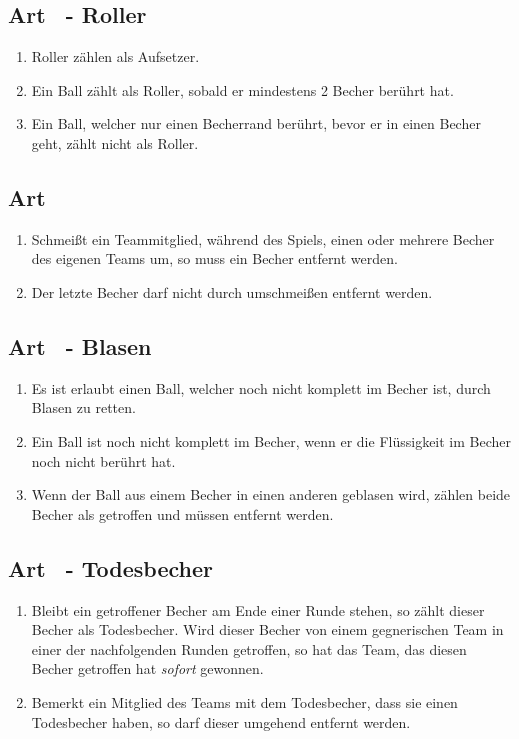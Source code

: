 \documentclass[a4paper,11pt]{scrartcl}
\newcommand{\enum}[1]{\begin{enumerate}[label=(\arabic*)]#1\end{enumerate}}
\newcommand{\art}[2]{\subsection*{#1} \enum{#2}}
\newcommand{\quot}[1]{\glqq #1\grqq}
\newcounter{art}
\begin{document}
    \art{Art \theart\ - Roller}{
        \item
            Roller zählen als Aufsetzer.
        \item
            Ein Ball zählt als Roller, sobald er mindestens 2 Becher berührt hat.
        \item
            Ein Ball, welcher nur einen Becherrand berührt, bevor er in einen Becher geht, zählt nicht als Roller.
    }

    \art{Art \theart}{
        \item
            Schmeißt ein Teammitglied, während des Spiels, einen oder mehrere Becher des eigenen Teams um, so muss ein Becher entfernt werden.
        \item
            Der letzte Becher darf nicht durch umschmeißen entfernt werden.
    }

    \art{Art \theart\ - \quot{Blasen}}{
        \item
            Es ist erlaubt einen Ball, welcher noch nicht komplett im Becher ist, durch \quot{Blasen} zu retten.
        \item
            Ein Ball ist noch nicht komplett im Becher, wenn er die Flüssigkeit im Becher noch nicht berührt hat.
        \item
            Wenn der Ball aus einem Becher in einen anderen geblasen wird, zählen beide Becher als getroffen und müssen entfernt werden.
    }

    \art{Art \theart\ - \quot{Todesbecher}}{
        \item
            Bleibt ein getroffener Becher am Ende einer Runde stehen, so zählt dieser Becher als \quot{Todesbecher}. Wird dieser Becher von einem gegnerischen Team in einer der nachfolgenden Runden getroffen, so hat das Team, das diesen Becher getroffen hat \emph{sofort} gewonnen.
        \item
            Bemerkt ein Mitglied des Teams mit dem \quot{Todesbecher}, dass sie einen \quot{Todesbecher} haben, so darf dieser umgehend entfernt werden.
    }
\end{document}
